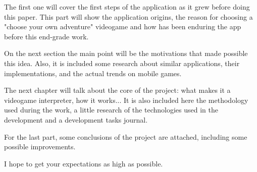 The first one will cover the first steps of the application as it grew before doing this paper. This part will show the application origins, the reason for choosing a "choose your own adventure" videogame and how has been enduring the app before this end-grade work. 

On the next section the main point will be the motivations that made possible this idea. Also, it is included some research about similar applications, their implementations, and the actual trends on mobile games.

The next chapter will talk about the core of the project: what makes it a videogame interpreter, how it works... It is also included here the methodology used during the work, a little research of the technologies used in the development and a development tasks journal.

For the last part, some conclusions of the project are attached, including some possible improvements.

I hope to get your expectations as high as possible.


